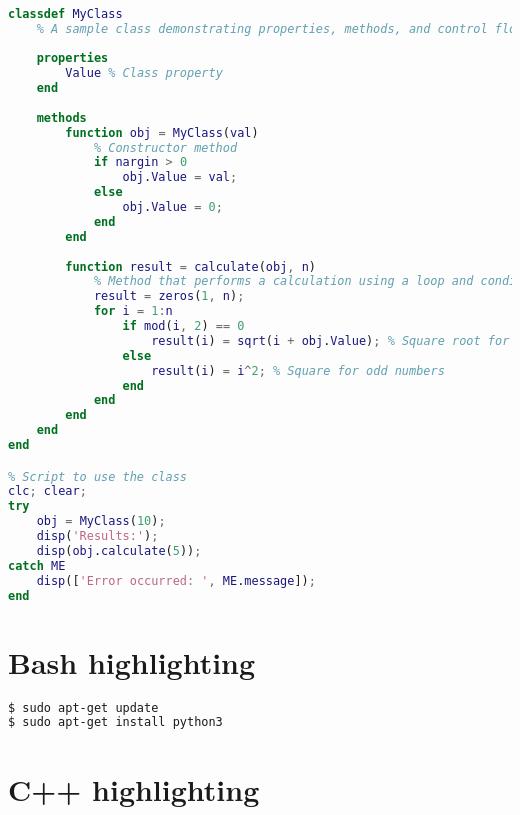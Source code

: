 \documentclass[12pt]{article}
\begin{document}
\begin{lstlisting}[caption={This is a literal MATLAB code}, label={lst:matlab1}, language=Matlab, style=custommatlab]
% MATLAB code snippet to demonstrate various grammar and keywords

classdef MyClass
    % A sample class demonstrating properties, methods, and control flow
    
    properties
        Value % Class property
    end
    
    methods
        function obj = MyClass(val)
            % Constructor method
            if nargin > 0
                obj.Value = val;
            else
                obj.Value = 0;
            end
        end
        
        function result = calculate(obj, n)
            % Method that performs a calculation using a loop and conditionals
            result = zeros(1, n);
            for i = 1:n
                if mod(i, 2) == 0
                    result(i) = sqrt(i + obj.Value); % Square root for even numbers
                else
                    result(i) = i^2; % Square for odd numbers
                end
            end
        end
    end
end

% Script to use the class
clc; clear;
try
    obj = MyClass(10);
    disp('Results:');
    disp(obj.calculate(5));
catch ME
    disp(['Error occurred: ', ME.message]);
end
\end{lstlisting}



\section{Bash highlighting}

\begin{lstlisting}[language=bash, style=custombash]
$ sudo apt-get update
$ sudo apt-get install python3
\end{lstlisting}

\section{C++ highlighting}
\end{document}
